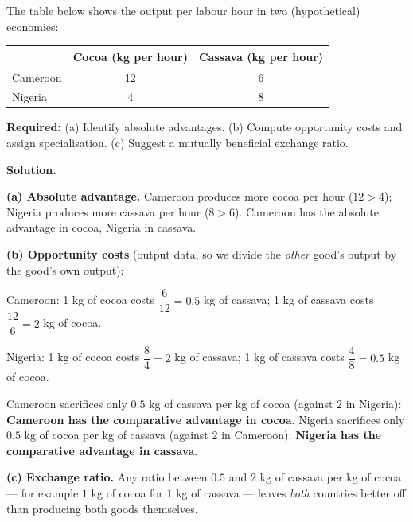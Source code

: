 \documentclass[11pt]{article}
\begin{document}
\begin{exoresolu}
The table below shows the output per labour hour in two (hypothetical) economies:

\begin{center}
\begin{tabular}{|l|c|c|}
\hline
\rowcolor{popblueL} & \textbf{Cocoa (kg per hour)} & \textbf{Cassava (kg per hour)} \\
\hline
Cameroon & 12 & 6 \\
\hline
Nigeria & 4 & 8 \\
\hline
\end{tabular}
\end{center}

\textbf{Required:} (a) Identify absolute advantages. (b) Compute opportunity costs and assign specialisation. (c) Suggest a mutually beneficial exchange ratio.

\tcblower
\textbf{Solution.}

\textbf{(a) Absolute advantage.} Cameroon produces more cocoa per hour ($12>4$); Nigeria produces more cassava per hour ($8>6$). Cameroon has the absolute advantage in cocoa, Nigeria in cassava.

\textbf{(b) Opportunity costs} (output data, so we divide the \emph{other} good's output by the good's own output):

Cameroon: 1 kg of cocoa costs $\dfrac{6}{12}=0.5$ kg of cassava; 1 kg of cassava costs $\dfrac{12}{6}=2$ kg of cocoa.

Nigeria: 1 kg of cocoa costs $\dfrac{8}{4}=2$ kg of cassava; 1 kg of cassava costs $\dfrac{4}{8}=0.5$ kg of cocoa.

Cameroon sacrifices only $0.5$ kg of cassava per kg of cocoa (against $2$ in Nigeria): \textbf{Cameroon has the comparative advantage in cocoa}. Nigeria sacrifices only $0.5$ kg of cocoa per kg of cassava (against $2$ in Cameroon): \textbf{Nigeria has the comparative advantage in cassava}.

\textbf{(c) Exchange ratio.} Any ratio between $0.5$ and $2$ kg of cassava per kg of cocoa --- for example $1$ kg of cocoa for $1$ kg of cassava --- leaves \emph{both} countries better off than producing both goods themselves.
\end{exoresolu}
\end{document}
